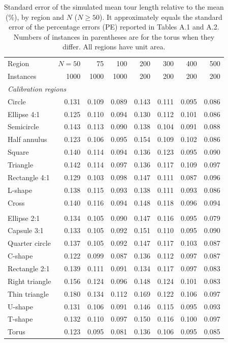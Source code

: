 \begin{table}[htbp]
\centering
\caption{Standard error of the simulated mean tour length relative to the mean (\%), by region and $N$ ($N \ge 50$). It approximately equals the standard error of the percentage errors (PE) reported in Tables A.1 and A.2. Numbers of instances in parentheses are for the torus when they differ. All regions have unit area.}
\label{tab:sim_variability}
\footnotesize
\begin{tabular}{lrrrrrrr}
\toprule
Region & $N = 50$ & 75 & 100 & 200 & 300 & 400 & 500 \\
Instances & 1000 & 1000 & 1000 & 200 & 200 & 200 & 200 \\
\midrule
\multicolumn{8}{l}{\textit{Calibration regions}} \\
\quad Circle & 0.131 & 0.109 & 0.089 & 0.143 & 0.111 & 0.095 & 0.086 \\
\quad Ellipse 4:1 & 0.125 & 0.110 & 0.094 & 0.130 & 0.112 & 0.101 & 0.086 \\
\quad Semicircle & 0.143 & 0.113 & 0.090 & 0.138 & 0.104 & 0.091 & 0.088 \\
\quad Half annulus & 0.123 & 0.106 & 0.095 & 0.154 & 0.109 & 0.102 & 0.086 \\
\quad Square & 0.140 & 0.114 & 0.094 & 0.136 & 0.123 & 0.095 & 0.090 \\
\quad Triangle & 0.142 & 0.114 & 0.097 & 0.136 & 0.117 & 0.109 & 0.097 \\
\quad Rectangle 4:1 & 0.129 & 0.103 & 0.098 & 0.147 & 0.111 & 0.087 & 0.096 \\
\quad L-shape & 0.138 & 0.115 & 0.093 & 0.138 & 0.111 & 0.093 & 0.086 \\
\quad Cross & 0.140 & 0.116 & 0.094 & 0.148 & 0.118 & 0.096 & 0.094 \\
\addlinespace[2pt]
\multicolumn{8}{l}{\textit{Validation regions}} \\
\quad Ellipse 2:1 & 0.134 & 0.105 & 0.090 & 0.147 & 0.116 & 0.095 & 0.079 \\
\quad Capsule 3:1 & 0.133 & 0.105 & 0.092 & 0.151 & 0.110 & 0.095 & 0.090 \\
\quad Quarter circle & 0.137 & 0.105 & 0.092 & 0.147 & 0.117 & 0.103 & 0.087 \\
\quad C-shape & 0.122 & 0.099 & 0.087 & 0.136 & 0.112 & 0.097 & 0.087 \\
\quad Rectangle 2:1 & 0.139 & 0.111 & 0.091 & 0.134 & 0.117 & 0.097 & 0.083 \\
\quad Right triangle & 0.156 & 0.124 & 0.096 & 0.148 & 0.124 & 0.101 & 0.083 \\
\quad Thin triangle & 0.180 & 0.134 & 0.112 & 0.169 & 0.122 & 0.106 & 0.097 \\
\quad U-shape & 0.131 & 0.106 & 0.091 & 0.146 & 0.115 & 0.095 & 0.093 \\
\quad T-shape & 0.132 & 0.110 & 0.097 & 0.150 & 0.116 & 0.100 & 0.097 \\
\addlinespace[2pt]
\quad Torus & 0.123 & 0.095 & 0.081 & 0.136 & 0.106 & 0.095 & 0.085 \\
\bottomrule
\end{tabular}
\end{table}
